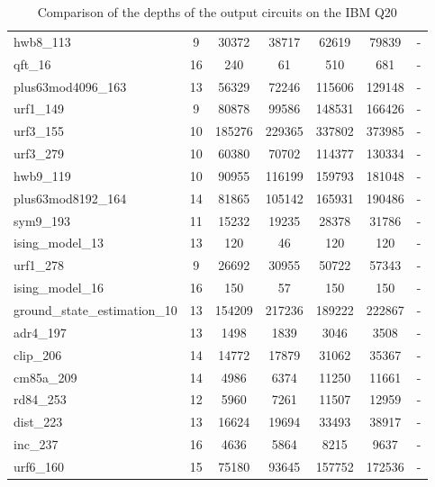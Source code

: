 \documentclass[journal]{IEEEtran}
\begin{document}
\begin{table*}[!th]
\begin{center}
\begin{tabular}{|p{4.3cm}<{\centering}|c|c|c|c|c|c|}
                           hwb8\_113 & 9 & 30372 & 38717 & 62619 & 79839 & - \\
                           qft\_16 & 16 & 240 & 61 & 510 & 681 & - \\
                           plus63mod4096\_163 & 13 & 56329 & 72246 & 115606 & 129148 & - \\
                           urf1\_149 & 9 & 80878 & 99586 & 148531 & 166426 & - \\
                           urf3\_155 & 10 & 185276 & 229365 & 337802 & 373985 & - \\
                           urf3\_279 & 10 & 60380 & 70702 & 114377 & 130334 & - \\
                           hwb9\_119 & 10 & 90955 & 116199 & 159793 & 181048 & - \\
                           plus63mod8192\_164 & 14 & 81865 & 105142 & 165931 & 190486 & - \\
                           sym9\_193 & 11 & 15232 & 19235 & 28378 & 31786 & - \\
                           ising\_model\_13 & 13 & 120 & 46 & 120 & 120 & - \\
                           urf1\_278 & 9 & 26692 & 30955 & 50722 & 57343 & - \\
                           ising\_model\_16 & 16 & 150 & 57 & 150 & 150 & - \\
                           ground\_state\_estimation\_10 & 13 & 154209 & 217236 & 189222 & 222867 & - \\
                           adr4\_197 & 13 & 1498 & 1839 & 3046 & 3508 & - \\
                           clip\_206 & 14 & 14772 & 17879 & 31062 & 35367 & - \\
                           cm85a\_209 & 14 & 4986 & 6374 & 11250 & 11661 & - \\
                           rd84\_253 & 12 & 5960 & 7261 & 11507 & 12959 & - \\
                           dist\_223 & 13 & 16624 & 19694 & 33493 & 38917 & - \\
                           inc\_237 & 16 & 4636 & 5864 & 8215 & 9637 & - \\
                           urf6\_160 & 15 & 75180 & 93645 & 157752 & 172536 & - \\
                           \hline
                          
                    \end{tabular} 
                  \end{center}					
                    \caption{Comparison of  the depths of the output circuits on the IBM Q20} 
                    \label{tab7}
                \end{table*}	
\end{document}
